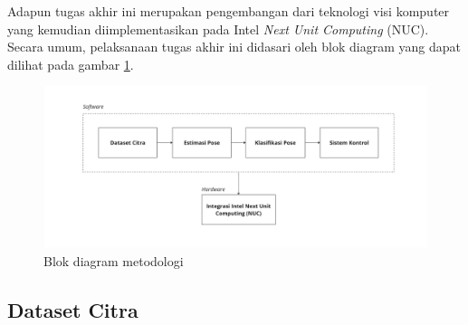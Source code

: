 Adapun tugas akhir ini merupakan pengembangan dari teknologi visi komputer yang kemudian diimplementasikan pada Intel \emph{Next Unit Computing} (NUC). Secara umum, pelaksanaan tugas akhir ini didasari oleh blok diagram yang dapat dilihat pada gambar \ref{fig:blockdiagrammethod}.

\begin{figure}[H]
  \centering

  \includegraphics[scale=0.16]{gambar/bab3-block-diagram-nuc.jpg}

  \caption{Blok diagram metodologi}
  \label{fig:blockdiagrammethod}
\end{figure}

\subsection{Dataset Citra}
\label{sec:metodologidataset}


